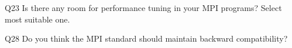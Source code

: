 \begin{description}%
\item{Q23} Is there any room for performance tuning in your MPI programs? Select most suitable one.%
\item{Q28} Do you think the MPI standard should maintain backward compatibility?%
\end{description}%
